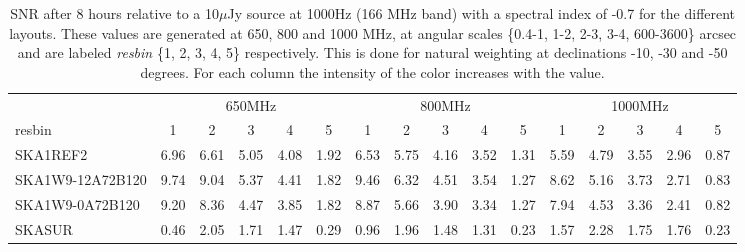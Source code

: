 \begin{table}[!htp]
{{\begin{tabular}{|lccccc||ccccc||ccccc|}
 \tabularnewline \cline{2-16} \multicolumn{1}{c}{ } & \multicolumn{5}{|c}{650MHz}  & \multicolumn{5}{c}{800MHz}  & \multicolumn{5}{c|}{1000MHz} \tabularnewline \cline{1-16} 
 resbin  &1 & 2 & 3 & 4 & 5 & 1 & 2 & 3 & 4 & 5 & 1 & 2 & 3 & 4 & 5 \tabularnewline \hline
SKA1REF2 & 6.96 \cellcolor{blue!47.42} & 6.61 \cellcolor{red!45.40} & 5.05 \cellcolor{green!56.33} & 4.08 \cellcolor{orange!55.29} & 1.92 \cellcolor{purple!60.00} & 6.53 \cellcolor{blue!45.52} & 5.75 \cellcolor{red!54.51} & 4.16 \cellcolor{green!55.15} & 3.52 \cellcolor{orange!59.62} & 1.31 \cellcolor{purple!60.00} & 5.59 \cellcolor{blue!41.95} & 4.79 \cellcolor{red!54.60} & 3.55 \cellcolor{green!56.18} & 2.96 \cellcolor{orange!60.00} & 0.87 \cellcolor{purple!60.00}\\ \hline 
SKA1W9-12A72B120 & 9.74 \cellcolor{blue!60.00} & 9.04 \cellcolor{red!60.00} & 5.37 \cellcolor{green!60.00} & 4.41 \cellcolor{orange!60.00} & 1.82 \cellcolor{purple!57.42} & 9.46 \cellcolor{blue!60.00} & 6.32 \cellcolor{red!60.00} & 4.51 \cellcolor{green!60.00} & 3.54 \cellcolor{orange!60.00} & 1.27 \cellcolor{purple!58.44} & 8.62 \cellcolor{blue!60.00} & 5.16 \cellcolor{red!60.00} & 3.73 \cellcolor{green!60.00} & 2.71 \cellcolor{orange!51.25} & 0.83 \cellcolor{purple!57.38}\\ \hline 
SKA1W9-0A72B120 & 9.20 \cellcolor{blue!57.56} & 8.36 \cellcolor{red!55.91} & 4.47 \cellcolor{green!49.67} & 3.85 \cellcolor{orange!52.00} & 1.82 \cellcolor{purple!57.42} & 8.87 \cellcolor{blue!57.08} & 5.66 \cellcolor{red!53.64} & 3.90 \cellcolor{green!51.54} & 3.34 \cellcolor{orange!56.23} & 1.27 \cellcolor{purple!58.44} & 7.94 \cellcolor{blue!55.95} & 4.53 \cellcolor{red!50.81} & 3.36 \cellcolor{green!52.15} & 2.41 \cellcolor{orange!40.75} & 0.82 \cellcolor{purple!56.72}\\ \hline 
SKASUR & 0.46 \cellcolor{blue!18.00} & 2.05 \cellcolor{red!18.00} & 1.71 \cellcolor{green!18.00} & 1.47 \cellcolor{orange!18.00} & 0.29 \cellcolor{purple!18.00} & 0.96 \cellcolor{blue!18.00} & 1.96 \cellcolor{red!18.00} & 1.48 \cellcolor{green!18.00} & 1.31 \cellcolor{orange!18.00} & 0.23 \cellcolor{purple!18.00} & 1.57 \cellcolor{blue!18.00} & 2.28 \cellcolor{red!18.00} & 1.75 \cellcolor{green!18.00} & 1.76 \cellcolor{orange!18.00} & 0.23 \cellcolor{purple!18.00}\tabularnewline \hline 
\end{tabular}}\hfil 

\caption{SNR after 8 hours relative to a 10$\mu$Jy source at 1000Hz (166 MHz band) with a spectral index of -0.7 for the different layouts. These values are generated at 650, 800 and 1000 MHz, at angular scales \{0.4-1, 1-2, 2-3, 3-4, 600-3600\} arcsec and are labeled {\it resbin} \{1, 2, 3, 4, 5\} respectively. This is done for natural weighting at declinations -10, -30 and -50 degrees. For each column the intensity of the color increases with the value.}\label{tab:snr10-band1}}
 \end{table}